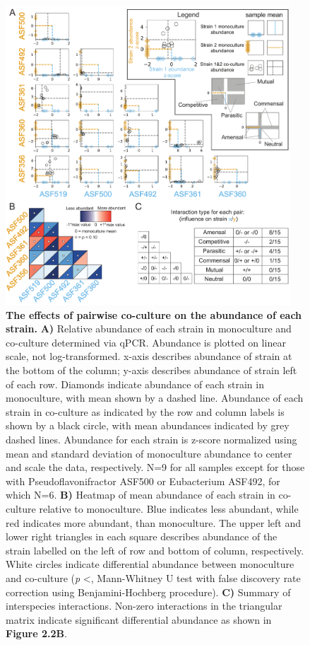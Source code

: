 \documentclass[11pt,twocolumn,notitlepage,openany,twoside]{book}
\begin{document}
\begin{refsection}
\begin{figure}
\centering
\includegraphics[width=0.95\textwidth]{ch2_fig2}
\caption[The effects of pairwise co-culture on the abundance of each strain.]{\textbf{The effects of pairwise co-culture on the abundance of each strain.} \textbf{A)} Relative abundance of each strain in monoculture and co-culture determined via qPCR. Abundance is plotted on linear scale, not log-transformed. x-axis describes abundance of strain at the bottom of the column; y-axis describes abundance of strain left of each row. Diamonds indicate abundance of each strain in monoculture, with mean shown by a dashed line. Abundance of each strain in co-culture as indicated by the row and column labels is shown by a black circle, with mean abundances indicated by grey dashed lines. Abundance for each strain is z-score normalized using mean and standard deviation of monoculture abundance to center and scale the data, respectively. N=9 for all samples except for those with Pseudoflavonifractor ASF500 or Eubacterium ASF492, for which N=6. \textbf{B)} Heatmap of mean abundance of each strain in co-culture relative to monoculture. Blue indicates less abundant, while red indicates more abundant, than monoculture. The upper left and lower right triangles in each square describes abundance of the strain labelled on the left of row and bottom of column, respectively. White circles indicate differential abundance between monoculture and co-culture (\textit{p} \textless{}, Mann-Whitney U test with false discovery rate correction using Benjamini-Hochberg procedure). \textbf{C)} Summary of interspecies interactions. Non-zero interactions in the triangular matrix indicate significant differential abundance as shown in \textbf{Figure 2.2B}.}
\end{figure}


\end{refsection}
\end{document}
